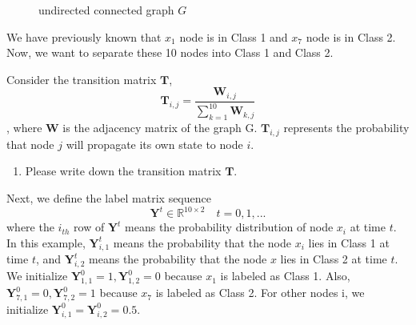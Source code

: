 \documentclass{article}
\begin{document}
\begin{figure}[ht!]
        \centering
        \caption{undirected connected graph $G$}
    \end{figure}

We have previously known that $x_1$ node is in Class 1 and $x_7$ node is in Class 2. Now, we want to separate these 10 nodes into Class 1 and Class 2.

Consider the transition matrix $\boldsymbol{T}$,
$$\boldsymbol{T}_{i,j} = \frac{\boldsymbol{W}_{i,j}}{\sum_{k=1}^{10} \boldsymbol{W}_{k,j}}$$,
where $\boldsymbol{W}$ is the adjacency matrix of the graph G. $\boldsymbol{T}_{i,j}$ represents the probability that node $j$ will propagate its own state to node $i$.

 \begin{enumerate}
\item Please write down the transition matrix $\boldsymbol{T}$.
\end{enumerate}

Next, we define the label matrix sequence $$\boldsymbol{Y}^t \in \mathbb{R}^{10 \times 2} \quad t=0,1,...$$ where the $i_{th}$ row of $\boldsymbol{Y}^t$ means the probability distribution of node $x_i$ at time $t$. In this example, $\boldsymbol{Y}^t_{i,1}$ means the probability that the node $x_i$ lies in Class 1 at time $t$, and $\boldsymbol{Y}^t_{i,2}$ means the probability that the node $x$ lies in Class 2 at time $t$. We initialize $\boldsymbol{Y}^0_{1,1}=1, \boldsymbol{Y}^0_{1,2}=0$ because $x_1$ is labeled as Class 1. Also, $\boldsymbol{Y}^0_{7,1}=0, \boldsymbol{Y}^0_{7,2}=1$ because $x_7$ is labeled as Class 2. For other nodes i,  we initialize $\boldsymbol{Y}^0_{i,1}=\boldsymbol{Y}^0_{i, 2}=0.5$.
\end{document}

